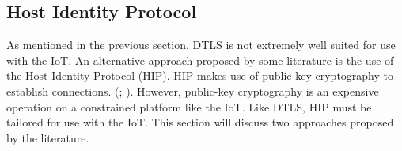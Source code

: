 \documentclass[letterpaper, 12pt]{article}
\begin{document}
\begin{flushleft}
\subsection*{Host Identity Protocol}

As mentioned in the previous section, DTLS is not extremely well suited for use with the IoT. An alternative
approach proposed by some literature is the use of the Host Identity Protocol (HIP). HIP makes use of public-key
cryptography to establish connections. (\cite{Hummen}; \cite{Garcia-Morchon:2013:SII:2462096.2462117}). However,
public-key cryptography is an expensive operation on a constrained platform like the IoT. Like DTLS, HIP must
be tailored for use with the IoT. This section will discuss two approaches proposed by the literature. 


\end{flushleft}
\end{document}
